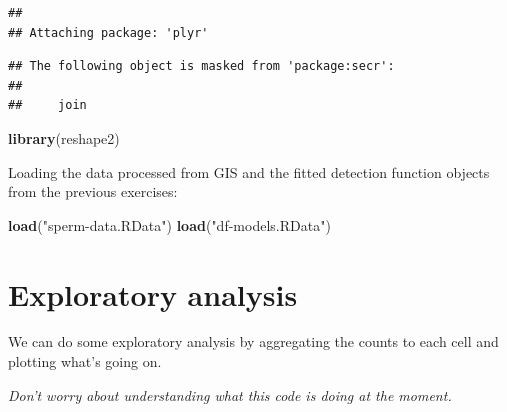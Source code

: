 \documentclass[]{book}
\newenvironment{Shaded}{\begin{snugshade}}{\end{snugshade}}
\newcommand{\KeywordTok}[1]{\textcolor[rgb]{0.13,0.29,0.53}{\textbf{#1}}}
\newcommand{\StringTok}[1]{\textcolor[rgb]{0.31,0.60,0.02}{#1}}
\newcommand{\NormalTok}[1]{#1}
\theoremstyle{definition}
\theoremstyle{definition}
\theoremstyle{remark}
\begin{document}
\begin{verbatim}
## 
## Attaching package: 'plyr'
\end{verbatim}

\begin{verbatim}
## The following object is masked from 'package:secr':
## 
##     join
\end{verbatim}

\begin{Shaded}
\begin{Highlighting}[]
\KeywordTok{library}\NormalTok{(reshape2)}
\end{Highlighting}
\end{Shaded}

Loading the data processed from GIS and the fitted detection function
objects from the previous exercises:

\begin{Shaded}
\begin{Highlighting}[]
\KeywordTok{load}\NormalTok{(}\StringTok{"sperm-data.RData"}\NormalTok{)}
\KeywordTok{load}\NormalTok{(}\StringTok{"df-models.RData"}\NormalTok{)}
\end{Highlighting}
\end{Shaded}

\section{Exploratory analysis}\label{exploratory-analysis-1}

We can do some exploratory analysis by aggregating the counts to each
cell and plotting what's going on.

\emph{Don't worry about understanding what this code is doing at the
moment.}
\end{document}

